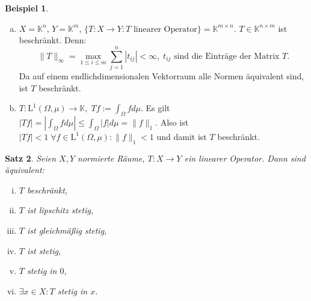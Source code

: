 \documentclass[ngerman]{report}
\theoremstyle{plain}%
\newtheorem{thm}{Satz}[chapter]
\theoremstyle{definition}%
\newtheorem{bsp}[thm]{Beispiel}
\theoremstyle{myStyle}
\newcommand{\C}{\mathbb{C}}
\newcommand{\R}{\mathbb{R}}
\newcommand{\K}{\mathbb{K}}
\newcommand{\lL}[2][\Omega,\mu]{\text{L}^{#2}(#1)} %
\newcommand{\norm}[1]{\|#1\|}
\newcommand{\intl}[1]{\int_\Omega #1 d\mu} %
\begin{document}
	\begin{bsp}
		\begin{enumerate}[a)]
			\item $X = \K^n$, $Y = \K^m$, $\{T: X\to Y: T \text{ linearer Operator}\} = \K^{m \times n}.$ $T\in\K^{n \times m}$ ist beschränkt. 
			Denn: 
			$$\norm{T}_\infty = \max_{1\leq i \leq m} \sum^n_{j=1} |t_{ij}| < \infty,\; t_{ij} \text{ sind die Einträge der Matrix }T.$$ Da auf einem endlichdimensionalen Vektorraum alle Normen äquivalent sind, ist $T$ beschränkt.
			\item $T: \lL{1} \to \K, \; Tf := \intl{f}.$ 
				Es gilt $|Tf| = |\intl{f}| \leq \intl{|f|} = \norm{f}_1.$
				Also ist $|Tf| < 1 \; \forall f \in \lL{1}: \norm{f}_1 < 1$ und damit ist $T$ beschränkt.
		\end{enumerate}
	\end{bsp}

	\begin{thm}
		Seien $X,Y$ normierte Räume, $T: X\to Y$ ein linearer Operator. Dann sind äquivalent:
			\begin{enumerate}[(i)]
				\item $T$ beschränkt,
				\item $T$ ist lipschitz stetig,
				\item $T$ ist gleichmäßig stetig,
				\item $T$ ist stetig,
				\item $T$ stetig in $0$,
				\item $\exists x \in X: T$ stetig in $x$.
			\end{enumerate}
	\end{thm}

\end{document}
